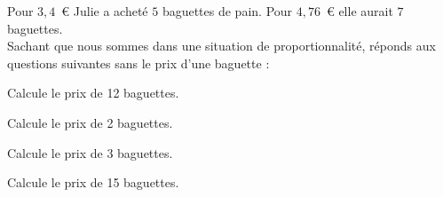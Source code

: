 Pour $3,4$~\textgreek{\euro} Julie a acheté $5$ baguettes de pain. Pour $4,76$~\textgreek{\euro} elle aurait $7$ baguettes.
\\Sachant que nous sommes dans une situation de proportionnalité, réponds aux questions suivantes sans le prix d'une baguette :
\begin{myenumerate}
	\item Calcule le prix de 12 baguettes.
	\item Calcule le prix de 2 baguettes.
	\item Calcule le prix de 3 baguettes.
	\item Calcule le prix de 15 baguettes.
\end{myenumerate}